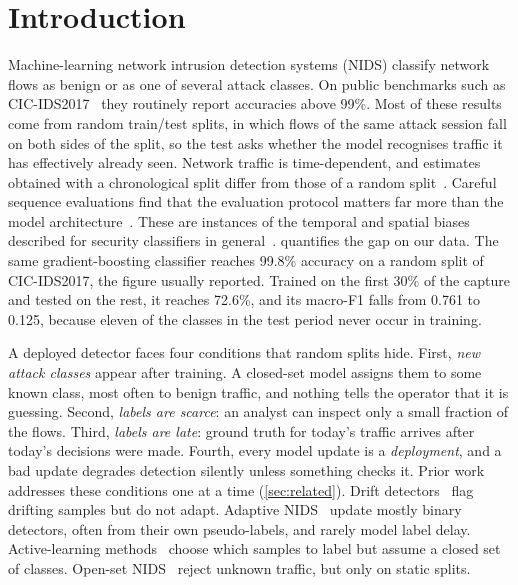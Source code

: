 \section{Introduction}
\label{sec:intro}

Machine-learning network intrusion detection systems (NIDS) classify network flows as benign or as one of several
attack classes. On public benchmarks such as CIC-IDS2017~\cite{sharafaldin2018} they routinely report accuracies
above 99\%. Most of these results come from random train/test splits, in which flows of the same attack session
fall on both sides of the split, so the test asks whether the model recognises traffic it has effectively already
seen. Network traffic is time-dependent, and estimates obtained with a chronological split differ from those of a
random split~\cite{nismara2026temporal}. Careful sequence evaluations find that the evaluation protocol matters far
more than the model architecture~\cite{moczkodan2026transformers}. These are instances of the temporal and spatial
biases described for security classifiers in general~\cite{pendlebury2019tesseract,arp2022dos}.
 quantifies the gap on our data. The same gradient-boosting classifier reaches 99.8\%
accuracy on a random split of CIC-IDS2017, the figure usually reported. Trained on the first 30\% of the capture
and tested on the rest, it reaches 72.6\%, and its macro-F1 falls from 0.761 to 0.125, because eleven of the
classes in the test period never occur in training.

A deployed detector faces four conditions that random splits hide. First, \emph{new attack classes} appear after
training. A closed-set model assigns them to some known class, most often to benign traffic, and nothing tells
the operator that it is guessing. Second, \emph{labels are scarce}: an analyst can inspect only a small fraction of
the flows. Third, \emph{labels are late}: ground truth for today's traffic arrives after today's decisions were
made. Fourth, every model update is a \emph{deployment}, and a bad update degrades detection silently unless
something checks it. Prior work addresses these conditions one at a time (\cref{sec:related}). Drift
detectors~\cite{jordaney2017transcend,yang2021cade} flag drifting samples but do not adapt. Adaptive
NIDS~\cite{andresini2021insomnia,zhang2024aoc,zhang2025ssf} update mostly binary detectors, often from their own
pseudo-labels, and rarely model label delay. Active-learning methods~\cite{chen2023continuous,gupta2025netguard}
choose which samples to label but assume a closed set of classes. Open-set NIDS~\cite{zhang2020osr,corsini2023ood}
reject unknown traffic, but only on static splits.

